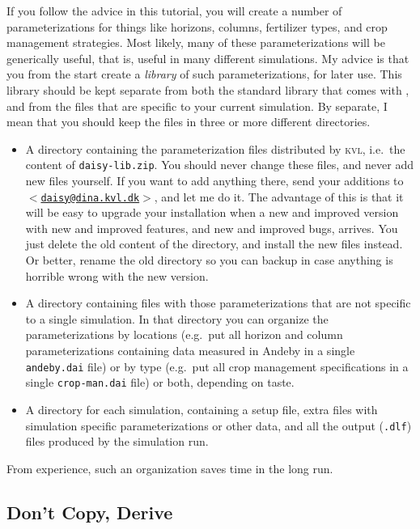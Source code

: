 \documentclass[a4paper,11pt]{article}
\begin{document}
If you follow the advice in this tutorial, you will create a number of
parameterizations for things like horizons, columns, fertilizer types,
and crop management strategies.  Most likely, many of these
parameterizations will be generically useful, that is, useful in many
different simulations.  My advice is that you from the start create a
\emph{library} of such parameterizations, for later use.  This library
should be kept separate from both the standard library that comes with
\daisy{}, and from the files that are specific to your current
simulation.  By separate, I mean that you should keep the files in
three or more different directories.
\begin{itemize}
\item A directory containing the parameterization files distributed by
  \textsc{kvl}, i.e.\ the content of \texttt{daisy-lib.zip}.  You
  should never change these files, and never add new files yourself.
  If you want to add anything there, send your additions to
  \href{mailto:daisy@dina.kvl.dk}{\texttt{$<$daisy@dina.kvl.dk$>$}},
  and let me do it.  The advantage of this is that it will be easy to
  upgrade your \daisy{} installation when a new and improved version
  with new and improved features, and new and improved bugs, arrives.
  You just delete the old content of the directory, and install the
  new files instead.  Or better, rename the old directory so you can
  backup in case anything is horrible wrong with the new version.
\item A directory containing files with those parameterizations that
  are not specific to a single simulation.  In that directory you can
  organize the parameterizations by locations (e.g.\ put all horizon
  and column parameterizations containing data measured in Andeby in a
  single \texttt{andeby.dai} file) or by type (e.g.\ put all crop
  management specifications in a single \texttt{crop-man.dai} file) or
  both, depending on taste.
\item A directory for each simulation, containing a setup file, extra
  files with simulation specific parameterizations or other data, and
  all the output (\texttt{.dlf}) files produced by the simulation run.
\end{itemize}
From experience, such an organization saves time in the long run.  

\subsection{Don't Copy, Derive}
\end{document}
